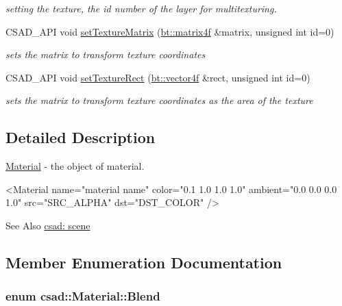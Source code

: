 \begin{DoxyCompactItemize}
\begin{DoxyCompactList}\small\item\em setting the texture, the id number of the layer for multitexturing. \end{DoxyCompactList}\item 
\hypertarget{classcsad_1_1_material_a814aec72ba2c958915ebcd9864cd39b5}{C\-S\-A\-D\-\_\-\-A\-P\-I void \hyperlink{classcsad_1_1_material_a814aec72ba2c958915ebcd9864cd39b5}{set\-Texture\-Matrix} (\hyperlink{classbt_1_1matrix4f}{bt\-::matrix4f} \&matrix, unsigned int id=0)}\label{classcsad_1_1_material_a814aec72ba2c958915ebcd9864cd39b5}

\begin{DoxyCompactList}\small\item\em sets the matrix to transform texture coordinates \end{DoxyCompactList}\item 
\hypertarget{classcsad_1_1_material_ab2f143ec735060d18c128f6617889d5e}{C\-S\-A\-D\-\_\-\-A\-P\-I void \hyperlink{classcsad_1_1_material_ab2f143ec735060d18c128f6617889d5e}{set\-Texture\-Rect} (\hyperlink{classbt_1_1vector4f}{bt\-::vector4f} \&rect, unsigned int id=0)}\label{classcsad_1_1_material_ab2f143ec735060d18c128f6617889d5e}

\begin{DoxyCompactList}\small\item\em sets the matrix to transform texture coordinates as the area of the texture \end{DoxyCompactList}\end{DoxyCompactItemize}


\subsection{Detailed Description}
\hyperlink{classcsad_1_1_material}{Material} -\/ the object of material. 

\begin{DoxyVerb}  <Material name="material name" color="0.1 1.0 1.0 1.0" ambient="0.0 0.0 0.0 1.0" src="SRC_ALPHA" dst="DST_COLOR" />
\end{DoxyVerb}
 \begin{DoxySeeAlso}{See Also}
\hyperlink{group__scene}{csad\-: scene} 
\end{DoxySeeAlso}


\subsection{Member Enumeration Documentation}
\hypertarget{classcsad_1_1_material_a2bce1dfef3df915e073ae55bfff7d8a0}{
\subsubsection[{Blend}]{\setlength{\rightskip}{0pt plus 5cm}enum {\bf csad\-::\-Material\-::\-Blend}}}\label{classcsad_1_1_material_a2bce1dfef3df915e073ae55bfff7d8a0}


